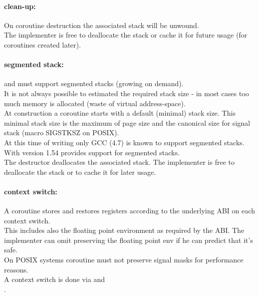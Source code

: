 \paragraph*{clean-up:}
On coroutine destruction the associated stack will be unwound.\\
\newline
The implementer is free to deallocate the stack or cache it for future usage
(for coroutines created later).

\paragraph*{segmented stack:}
\pushcoro and \pullcoro must support segmented stacks (growing on demand).\\
\newline
It is not always possible to estimated the required stack size - in most cases
too much memory is allocated (waste of virtual address-space).\\
\newline
At construction a coroutine starts with a default (minimal) stack size. This
minimal stack size is the maximum of page size and the canonical size for signal
stack (macro SIGSTKSZ on POSIX).\\
\newline
At this time of writing only GCC (4.7)\cite{gccsplit} is known to support
segmented stacks. With version 1.54 \boostcoroutine provides support for
segmented stacks.\\
\newline
The destructor deallocates the associated stack. The implementer is free to
deallocate the stack or to cache it for later usage.

\paragraph*{context switch:}
A coroutine stores and restores registers according to the underlying ABI on
each context switch.\\
\newline
This includes also the floating point environment as required by the ABI. The
implementer can omit preserving the floating point env if he can predict that
it's safe.\\
\newline
On POSIX systems coroutine must not preserve signal masks for performance
reasons.\\
\newline
A context switch is done via \pushcoroop and\\
\pullcoroop.

